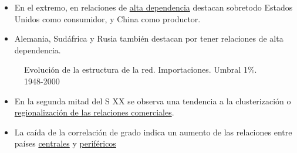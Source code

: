\documentclass[compress]{beamer}
\begin{document}
\begin{frame}

\begin{itemize}
\item[\faRebel] En el extremo, en relaciones de \underline{alta dependencia} destacan sobretodo Estados Unidos como consumidor, y China como productor.
\item[\faRebel] Alemania, Sudáfrica y Rusia también destacan por tener relaciones de alta dependencia. 
\end{itemize}
\end{frame}



\begin{frame}
\begin{figure}

\centering
{}
\caption*{\scriptsize Evolución de la estructura de la red. Importaciones. Umbral 1\%. 1948-2000}
\label{fig:metricas_LP}
\end{figure}

\small
\begin{itemize}[label=\faRebel]
\item En la segunda mitad del S XX se observa una tendencia a la clusterización o \underline{regionalización de las relaciones comerciales}.
\item La caída de la correlación de grado indica un aumento de las relaciones entre países \underline{centrales} y \underline{periféricos}
\end{itemize}


\end{frame}
\end{document}
